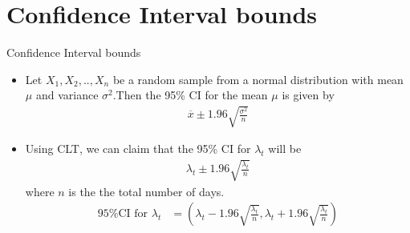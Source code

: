 \documentclass[10pt]{beamer}
\begin{document}
\section{Confidence Interval bounds}
\begin{frame}{Confidence Interval bounds}
    \begin{itemize}
        \item Let $X_1,X_2,..,X_n$ be a random sample from a normal distribution with mean $\mu$ and variance $\sigma^2$.Then the 95\% CI for the mean $\mu$ is given by
        \begin{align}
            \overline{x} \pm 1.96\sqrt{\frac{\sigma^2}{n}}
        \end{align}
        \item Using CLT, we can claim that the 95\% CI for $\lambda_t$ will be
        \begin{align}
    {\lambda_t} \pm 1.96\sqrt{\frac{{\lambda_t}}{n}}
\end{align}
where $n$ is the the total number of days.
\begin{align}
    \text{95\% CI for $\lambda_t$} &= \left(\lambda_t-1.96\sqrt{\frac{\lambda_t}{n}},\lambda_t+1.96\sqrt{\frac{\lambda_t}{n}} \right)
\end{align}
    \end{itemize}
\end{frame}
\end{document}
